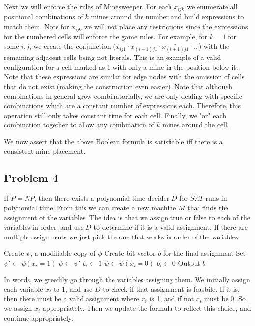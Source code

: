 \documentclass[english]{article}
\begin{document}
Next we will enforce the rules of Minesweeper. For each $x_{ijk}$ we enumerate all positional
combinations of $k$ mines around the number and build expressions to match them. Note for $x_{ij0}$
we will not place any restrictions since the expressions for the numbered cells will enforce the
game rules. For example, for $k = 1$ for some $i,j$, we create the conjunction
($x_{ij1} \cdot x_{(i+1)j1} \cdot \bar{x_{(i+1)j1}} \cdot ...$) with the remaining adjacent cells
being not literals. This is an example of a valid configuration for a cell marked as 1 with only
a mine in the position below it. Note that these expressions are similar for edge nodes with the
omission of cells that do not exist (making the construction even easier). Note that although
combinations in general grow combinatorially, we are only dealing with specific combinations which
are a constant number of expressions each. Therefore, this operation still only takes constant time
for each cell. Finally, we "or" each combination together to allow any combination of $k$ mines
around the cell.

We now assert that the above Boolean formula is satisfiable iff there is a consistent mine placement.

\subsection*{Problem 4}
If $P = NP$, then there exists a polynomial time decider $D$ for $SAT$ runs in polynomial time. From this we can
create a new machine $M$ that finds the assignment of the variables. The idea is that we assign true or false to
each of the variables in order, and use $D$ to determine if it is a valid assignment. If there are multiple
assignments we just pick the one that works in order of the variables.

\begin{algorithmic}
	\State Create $\psi$, a modifiable copy of $\phi$
	\State Create bit vector $b$ for the final assignment
		\State Set $\psi' \leftarrow \psi(x_i=1)$
			\State $\psi \leftarrow \psi'$
			\State $b_i \leftarrow 1$ 
		\Else
			\State $\psi \leftarrow \psi(x_i=0)$
			\State $b_i \leftarrow 0$ 
		\EndIf
	\EndFor
	\State Output $b$
\EndFunction 
\end{algorithmic}

In words, we greedily go through the variables assigning them. We initially assign each variable $x_i$ to 1, and use
$D$ to check if that assignment is feasbile. If it is, then there must be a valid assignment where $x_i$ is 1, and if
not $x_i$ must be 0. So we assign $x_i$ appropriately. Then we update the formula to reflect this choice, and
continue appropriately.
\end{document}
